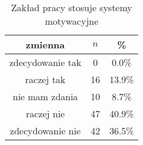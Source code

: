 \begin{table}[H]
\caption{Zakład pracy stosuje systemy motywacyjne}
\centering
\begin{tabular}{ | c | c | c |}
\hline
zmienna & $n$ & \% \\
\hline
zdecydowanie tak  &  0  & 0.0\% \\
\hline
raczej tak  &  16  & 13.9\% \\
\hline
nie mam zdania  &  10  & 8.7\% \\
\hline
raczej nie  &  47  & 40.9\% \\
\hline
zdecydowanie nie  &  42  & 36.5\% \\
\hline
\end{tabular}
\label{tab:Q9}
\end{table}

